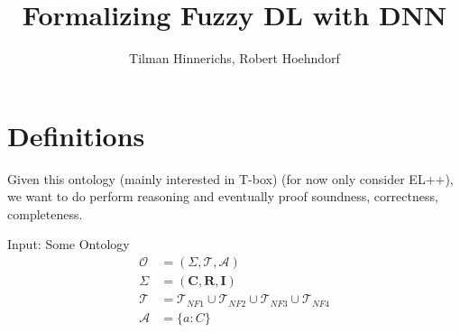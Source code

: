 \documentclass[]{article}
\title{Formalizing Fuzzy DL with DNN}
\author{Tilman Hinnerichs, Robert Hoehndorf}
\date{}
\begin{document}
\maketitle

\section{Definitions}

Given this ontology (mainly interested in T-box) (for now only consider EL++), we want to do perform reasoning and eventually proof soundness, correctness, completeness. 

Input: Some Ontology
\begin{align*}
	\mathcal{O}&=(\Sigma,\mathcal{T,A})\\
	\Sigma &=(\mathbf{C,R,I})\\
	\mathcal{T} &= \mathcal{T}_{NF1} \cup \mathcal{T}_{NF2} \cup \mathcal{T}_{NF3} \cup \mathcal{T}_{NF4}\\
	\mathcal{A}&=\{a:C\}
\end{align*}
\end{document}
